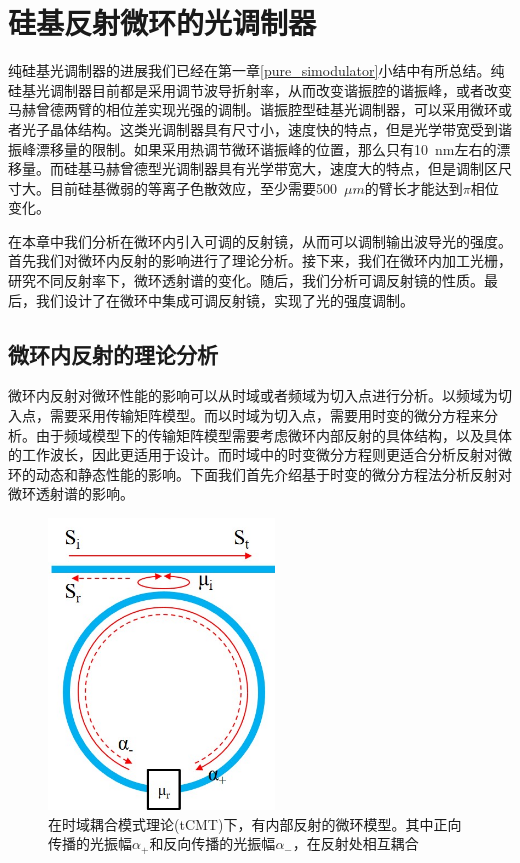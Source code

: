 \chapter{硅基反射微环的光调制器}
纯硅基光调制器的进展我们已经在第一章\ref{pure_simodulator}小结中有所总结。纯硅基光调制器目前都是采用调节波导折射率，从而改变谐振腔的谐振峰，或者改变马赫曾德两臂的相位差实现光强的调制。谐振腔型硅基光调制器，可以采用微环或者光子晶体结构。这类光调制器具有尺寸小，速度快的特点，但是光学带宽受到谐振峰漂移量的限制。如果采用热调节微环谐振峰的位置，那么只有10~nm左右的漂移量。而硅基马赫曾德型光调制器具有光学带宽大，速度大的特点，但是调制区尺寸大。目前硅基微弱的等离子色散效应，至少需要500~$\mu m$的臂长才能达到$\pi$相位变化。

在本章中我们分析在微环内引入可调的反射镜，从而可以调制输出波导光的强度。首先我们对微环内反射的影响进行了理论分析。接下来，我们在微环内加工光栅，研究不同反射率下，微环透射谱的变化。随后，我们分析可调反射镜的性质。最后，我们设计了在微环中集成可调反射镜，实现了光的强度调制。
\section{微环内反射的理论分析}
微环内反射对微环性能的影响可以从时域或者频域为切入点进行分析。以频域为切入点，需要采用传输矩阵模型\cite{yariv2006photonics}。而以时域为切入点，需要用时变的微分方程来分析\cite{haus1984waves}。由于频域模型下的传输矩阵模型需要考虑微环内部反射的具体结构，以及具体的工作波长，因此更适用于设计。而时域中的时变微分方程则更适合分析反射对微环的动态和静态性能的影响。下面我们首先介绍基于时变的微分方程法分析反射对微环透射谱的影响\cite{haus1984waves,Li2016design,little1997microring}。
\begin{figure}[htb]
	\centering
	\includegraphics[width=6cm]{./Pictures/chapt5_ring_reflector_structure.jpg}
	\caption{在时域耦合模式理论(tCMT)下，有内部反射的微环模型。其中正向传播的光振幅$\alpha_+$和反向传播的光振幅$\alpha_-$，在反射处相互耦合}
	\label{chapt5_ring_reflector_structure}
\end{figure}

